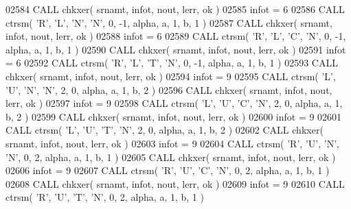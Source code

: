 \begin{DoxyCode}
02584       \textcolor{keyword}{CALL }chkxer( srnamt, infot, nout, lerr, ok )
02585       infot = 6
02586       \textcolor{keyword}{CALL }ctrsm( \textcolor{stringliteral}{'R'}, \textcolor{stringliteral}{'L'}, \textcolor{stringliteral}{'N'}, \textcolor{stringliteral}{'N'}, 0, -1, alpha, a, 1, b, 1 )
02587       \textcolor{keyword}{CALL }chkxer( srnamt, infot, nout, lerr, ok )
02588       infot = 6
02589       \textcolor{keyword}{CALL }ctrsm( \textcolor{stringliteral}{'R'}, \textcolor{stringliteral}{'L'}, \textcolor{stringliteral}{'C'}, \textcolor{stringliteral}{'N'}, 0, -1, alpha, a, 1, b, 1 )
02590       \textcolor{keyword}{CALL }chkxer( srnamt, infot, nout, lerr, ok )
02591       infot = 6
02592       \textcolor{keyword}{CALL }ctrsm( \textcolor{stringliteral}{'R'}, \textcolor{stringliteral}{'L'}, \textcolor{stringliteral}{'T'}, \textcolor{stringliteral}{'N'}, 0, -1, alpha, a, 1, b, 1 )
02593       \textcolor{keyword}{CALL }chkxer( srnamt, infot, nout, lerr, ok )
02594       infot = 9
02595       \textcolor{keyword}{CALL }ctrsm( \textcolor{stringliteral}{'L'}, \textcolor{stringliteral}{'U'}, \textcolor{stringliteral}{'N'}, \textcolor{stringliteral}{'N'}, 2, 0, alpha, a, 1, b, 2 )
02596       \textcolor{keyword}{CALL }chkxer( srnamt, infot, nout, lerr, ok )
02597       infot = 9
02598       \textcolor{keyword}{CALL }ctrsm( \textcolor{stringliteral}{'L'}, \textcolor{stringliteral}{'U'}, \textcolor{stringliteral}{'C'}, \textcolor{stringliteral}{'N'}, 2, 0, alpha, a, 1, b, 2 )
02599       \textcolor{keyword}{CALL }chkxer( srnamt, infot, nout, lerr, ok )
02600       infot = 9
02601       \textcolor{keyword}{CALL }ctrsm( \textcolor{stringliteral}{'L'}, \textcolor{stringliteral}{'U'}, \textcolor{stringliteral}{'T'}, \textcolor{stringliteral}{'N'}, 2, 0, alpha, a, 1, b, 2 )
02602       \textcolor{keyword}{CALL }chkxer( srnamt, infot, nout, lerr, ok )
02603       infot = 9
02604       \textcolor{keyword}{CALL }ctrsm( \textcolor{stringliteral}{'R'}, \textcolor{stringliteral}{'U'}, \textcolor{stringliteral}{'N'}, \textcolor{stringliteral}{'N'}, 0, 2, alpha, a, 1, b, 1 )
02605       \textcolor{keyword}{CALL }chkxer( srnamt, infot, nout, lerr, ok )
02606       infot = 9
02607       \textcolor{keyword}{CALL }ctrsm( \textcolor{stringliteral}{'R'}, \textcolor{stringliteral}{'U'}, \textcolor{stringliteral}{'C'}, \textcolor{stringliteral}{'N'}, 0, 2, alpha, a, 1, b, 1 )
02608       \textcolor{keyword}{CALL }chkxer( srnamt, infot, nout, lerr, ok )
02609       infot = 9
02610       \textcolor{keyword}{CALL }ctrsm( \textcolor{stringliteral}{'R'}, \textcolor{stringliteral}{'U'}, \textcolor{stringliteral}{'T'}, \textcolor{stringliteral}{'N'}, 0, 2, alpha, a, 1, b, 1 )

\end{DoxyCode}
